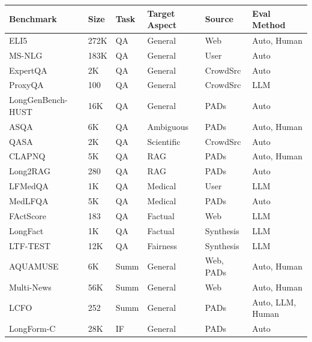 \documentclass[11pt, a4paper, logo, copyright, nonumbering]{map}
\begin{document}
\begin{table}[!htp]
    \centering
    \footnotesize
    \renewcommand{\arraystretch}{1.25}
    \setlength\tabcolsep{10pt}
    
    \begin{tabular}{llllll}
    \toprule
    \textbf{Benchmark} & \textbf{Size} & \textbf{Task} & \textbf{Target Aspect} & \textbf{Source} & \textbf{Eval Method} \\ 
    \midrule
    ELI5~\citep{fan2019eli5} & 272K & QA & General & Web & Auto, Human \\
    MS-NLG~\citep{nguyen2016ms} & 183K & QA & General & User & Auto \\
    ExpertQA~\citep{malaviya2023expertqa} & 2K & QA & General & CrowdSrc & Auto \\
    ProxyQA~\citep{tan2024proxyqa} & 100 & QA & General & CrowdSrc & LLM \\
    LongGenBench-HUST~\citep{liu2024longgenbench} & 16K & QA & General & PADs & Auto \\
    ASQA~\citep{stelmakh2022asqa} & 6K & QA & Ambiguous & PADs & Auto, Human \\
    QASA~\citep{lee2023qasa} & 2K & QA & Scientific & CrowdSrc & Auto \\
    CLAPNQ~\citep{rosenthal2024clapnq} & 5K & QA & RAG & PADs & Auto, Human \\
    Long2RAG~\citep{qi2024long2rag} & 280 & QA & RAG & PADs & Auto \\
    LFMedQA~\citep{hosseini2024benchmark} & 1K & QA & Medical & User & LLM \\
    MedLFQA~\citep{jeong2024olaph} & 5K & QA & Medical & PADs & Auto \\
    FActScore~\citep{min2023factscore} & 183 & QA & Factual & Web & LLM \\
    LongFact~\citep{wei2024long} & 1K & QA & Factual & Synthesis & LLM \\
    LTF-TEST~\citep{jeung2024large} & 12K & QA & Fairness & Synthesis & LLM \\
    AQUAMUSE~\citep{kulkarni2020aquamuse} & 6K & Summ & General & Web, PADs & Auto, Human \\
    Multi-News~\citep{fabbri2019multi} &  56K & Summ & General & Web & Auto, Human \\
    LCFO~\citep{costa2024lcfo} & 252 & Summ & General & PADs & Auto, LLM, Human \\
    LongForm-C~\citep{koksal2023longform} & 28K & IF & General & PADs & Auto \\

\end{tabular}
\end{table}
\end{document}
